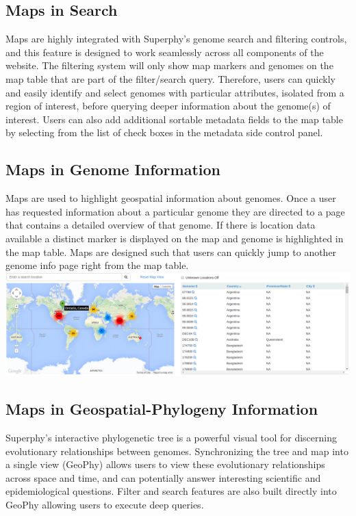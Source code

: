 \documentclass{bmcart}
\begin{document}
\subsection{Maps in Search}
Maps are highly integrated with Superphy's genome search and filtering controls, and this feature is designed to work seamlessly across all components of the website. The filtering system will only show map markers and genomes on the map table that are part of the filter/search query. Therefore, users can quickly and easily identify and select genomes with particular attributes, isolated from a region of interest, before querying deeper information about the genome(s) of interest. Users can also add additional sortable metadata fields to the map table by selecting from the list of check boxes in the metadata side control panel. 
\pagebreak

\begin{landscape}
\subsection{Maps in Genome Information}
Maps are used to highlight geospatial information about genomes. Once a user has requested information about a particular genome they are directed to a page that contains a detailed overview of that genome. If there is location data available a distinct marker is displayed on the map and genome is highlighted in the map table. Maps are designed such that users can quickly jump to another genome info page right from the map table.\\

\includegraphics[scale=0.36]{../manuscript_images/genome-info.png}
\end{landscape}

\subsection{Maps in Geospatial-Phylogeny Information}
Superphy's interactive phylogenetic tree is a powerful visual tool for discerning evolutionary relationships between genomes. Synchronizing the tree and map into a single view (GeoPhy) allows users to view these evolutionary relationships across space and time, and can potentially answer interesting scientific and epidemiological questions. Filter and search features are also built directly into GeoPhy allowing users to execute deep queries.
\end{document}
